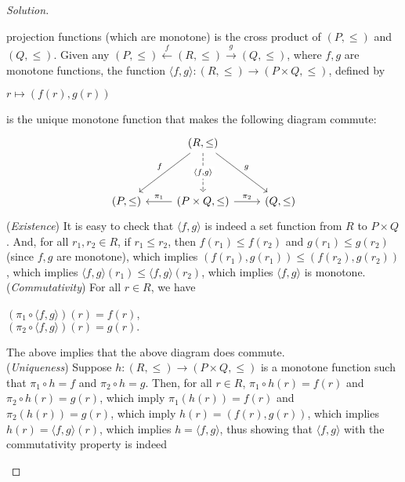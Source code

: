 \documentclass[]{amsbook}
\newcommand{\0}{\mathbf{0}}
\newcommand{\1}{\mathbf{1}}
\newenvironment{solution}
    {\begin{proof}[Solution]}{\end{proof}}
\begin{document}
\begin{solution}
\begin{enumerate}
        projection functions (which are monotone) is the cross product of $(P,
        \le)$ and $(Q, \le)$. Given any $(P, \le) \xleftarrow{f} (R, \le)
        \xrightarrow{g} (Q, \le)$, where $f, g$ are monotone functions, the
        function $\langle f, g \rangle : (R, \le) \to (P \times Q, \le)$, defined
        by
        \begin{center}
            $r \mapsto (f(r), g(r))$
        \end{center}
        is the unique monotone function that makes the following diagram commute:
        \[
        \begin{tikzcd}
            & (R, \le) \arrow[ddl, swap, "f"]
                \arrow[dd, dashrightarrow, "{\langle f, g \rangle}" description]
                \arrow[ddr, "g"] & \\
            & & \\
            (P, \le) & (P \times Q, \le) \arrow[l, swap, "\pi_1"]
            \arrow[r, "\pi_2"] & (Q, \le)
        \end{tikzcd}
        \]
        (\emph{Existence}) It is easy to check that $\langle f, g \rangle$ is
        indeed a set function from $R$ to $P \times Q$. And, for all $r_1, r_2
        \in R$, if $r_1 \le r_2$, then $f(r_1) \le f(r_2)$ and $g(r_1) \le
        g(r_2)$ (since $f, g$ are monotone), which implies $(f(r_1), g(r_1)) \le
        (f(r_2), g(r_2))$, which implies $\langle f, g \rangle (r_1) \le
        \langle f, g \rangle (r_2)$, which implies $\langle f, g \rangle$ is
        monotone.\\
        (\emph{Commutativity}) For all $r \in R$, we have
        \begin{center}
            $(\pi_1 \circ \langle f, g \rangle)(r) = f(r)$,\\
            $(\pi_2 \circ \langle f, g \rangle)(r) = g(r).$
        \end{center}
        The above implies that the above diagram does commute.\\
        (\emph{Uniqueness}) Suppose $h: (R, \le) \to (P \times Q, \le)$ is a
        monotone function such that $\pi_1 \circ h = f$ and $\pi_2 \circ h = g$.
        Then, for all $r \in R$, $\pi_1 \circ h (r)= f(r)$ and $\pi_2 \circ h
        (r)= g(r)$, which imply $\pi_1(h(r)) = f(r)$ and $\pi_2(h(r)) = g(r)$,
        which imply $h(r) = (f(r), g(r))$, which implies $h(r) = \langle f, g
        \rangle (r)$, which implies $h = \langle f, g \rangle$, thus showing
        that $\langle f, g \rangle$ with the commutativity property is indeed

\end{enumerate}
\end{solution}
\end{document}
